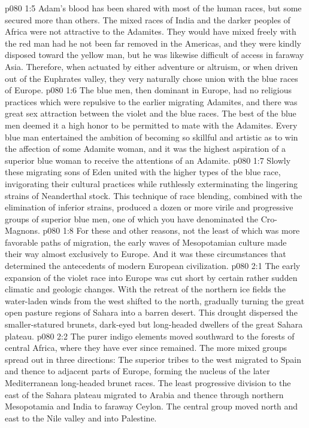 \vs p080 1:5 Adam’s blood has been shared with most of the human races, but some secured more than others. The mixed races of India and the darker peoples of Africa were not attractive to the Adamites. They would have mixed freely with the red man had he not been far removed in the Americas, and they were kindly disposed toward the yellow man, but he was likewise difficult of access in faraway Asia. Therefore, when actuated by either adventure or altruism, or when driven out of the Euphrates valley, they very naturally chose union with the blue races of Europe.
\vs p080 1:6 The blue men, then dominant in Europe, had no religious practices which were repulsive to the earlier migrating Adamites, and there was great sex attraction between the violet and the blue races. The best of the blue men deemed it a high honor to be permitted to mate with the Adamites. Every blue man entertained the ambition of becoming so skillful and artistic as to win the affection of some Adamite woman, and it was the highest aspiration of a superior blue woman to receive the attentions of an Adamite.
\vs p080 1:7 Slowly these migrating sons of Eden united with the higher types of the blue race, invigorating their cultural practices while ruthlessly exterminating the lingering strains of Neanderthal stock. This technique of race blending, combined with the elimination of inferior strains, produced a dozen or more virile and progressive groups of superior blue men, one of which you have denominated the Cro\hyp{}Magnons.
\vs p080 1:8 For these and other reasons, not the least of which was more favorable paths of migration, the early waves of Mesopotamian culture made their way almost exclusively to Europe. And it was these circumstances that determined the antecedents of modern European civilization.
\vs p080 2:1 The early expansion of the violet race into Europe was cut short by certain rather sudden climatic and geologic changes. With the retreat of the northern ice fields the water\hyp{}laden winds from the west shifted to the north, gradually turning the great open pasture regions of Sahara into a barren desert. This drought dispersed the smaller\hyp{}statured brunets, dark\hyp{}eyed but long\hyp{}headed dwellers of the great Sahara plateau.
\vs p080 2:2 The purer indigo elements moved southward to the forests of central Africa, where they have ever since remained. The more mixed groups spread out in three directions: The superior tribes to the west migrated to Spain and thence to adjacent parts of Europe, forming the nucleus of the later Mediterranean long\hyp{}headed brunet races. The least progressive division to the east of the Sahara plateau migrated to Arabia and thence through northern Mesopotamia and India to faraway Ceylon. The central group moved north and east to the Nile valley and into Palestine.
